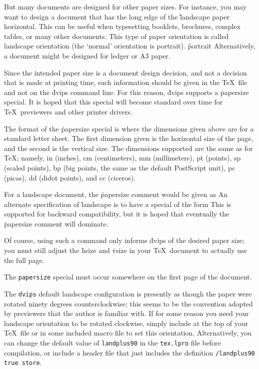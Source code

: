 But many documents are designed for other paper sizes.	For instance,
you may want to design a document that has the long edge of the
\^{landscape}
paper horizontal.  This can be useful when typesetting booklets,
brochures, complex tables, or many other documents.  This type of
paper orientation is called landscape orientation (the `normal'
orientation is portrait).
\^{portrait}
Alternatively, a document might be designed for ledger or A3 paper.

Since the intended paper size is a document design decision, and
not a decision that is made at printing time, such information
should be given in the \TeX\ file and not on the \.{dvips}
command line.  For this reason, \.{dvips} supports a \.{papersize}
special.  It is hoped that this special will become standard over
time for \TeX\ previewers and other printer drivers.

The format of the \.{papersize} special is
\noindent
where the dimensions given above are for a standard letter sheet.
The first dimension given is the horizontal size of the page, and
the second is the vertical size.  The dimensions supported are
the same as for \TeX; namely, in (inches), cm (centimeters), mm
(millimeters), pt (points), sp (scaled points), bp (big points, the
same as the default PostScript unit), pc (picas), dd (didot points),
and cc (ciceros).

For a landscape document, the \.{papersize} comment would be given as
\noindent
An alternate specification of \.{landscape} is to have a special
of the form
\noindent
This is supported for backward compatibility, but it is hoped that
eventually the \.{papersize} comment will dominate.

Of course, using such a command only informs \.{dvips} of the desired
paper size; you must still adjust the \.{hsize} and \.{vsize} in your
\TeX\ document to actually use the full page.

The {\tt papersize} special must occur somewhere on the first page of the
document.

The {\tt dvips} default landscape configuration is presently as though
the paper were rotated ninety degrees counterclockwise; this seems
to be the convention adopted by previewers that the author is
familiar with.	If for some reason you need your landscape orientation
to be rotated clockwise, simply include at the top of your \TeX\ file
or in some included macro file
\noindent
to set this orientation.  Alternatively, you can change the default
value of {\tt landplus90} in the {\tt tex.lpro} file before
compilation, or include a header file that just includes the
definition {\tt /landplus90 true store}.

